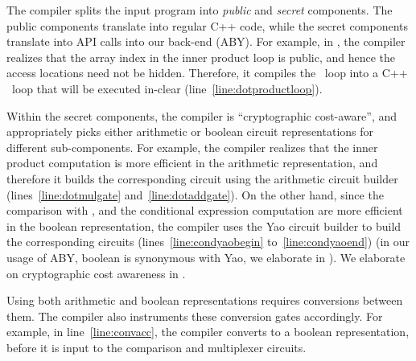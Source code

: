 The compiler splits the input
program into \emph{public} and \emph{secret} components. The public
components translate into regular C++ code, while the secret
components translate into API calls into our \mpc back-end
(ABY). For example, in , the \tool
compiler realizes that the array index  in the inner product loop
is public, and hence the access locations need not be hidden.
Therefore, it compiles the ~loop into a C++
~loop that will be executed in-clear
(line~\ref{line:dotproductloop}).

Within the secret components, the \tool compiler is ``cryptographic
cost-aware'', and appropriately picks either arithmetic or boolean
circuit representations for different sub-components. For example,
the compiler realizes that the inner product computation is more
efficient in the arithmetic representation, and therefore it builds
the corresponding circuit using the arithmetic circuit builder
 (lines~\ref{line:dotmulgate} and~\ref{line:dotaddgate}). On
the other hand, since the comparison with , and the conditional
expression computation are more efficient in the boolean
representation, the \tool compiler uses the Yao circuit builder
 to build the corresponding circuits
(lines~\ref{line:condyaobegin} to~\ref{line:condyaoend}) (in our usage
of ABY, boolean is synonymous with Yao, we elaborate in
). We elaborate on cryptographic cost awareness in
.

Using both arithmetic and boolean representations requires conversions between them.
The \tool compiler also
instruments these conversion gates accordingly. For example, in
line~\ref{line:convacc}, the compiler converts
 to a boolean representation, before it is
input to the comparison and multiplexer circuits.

